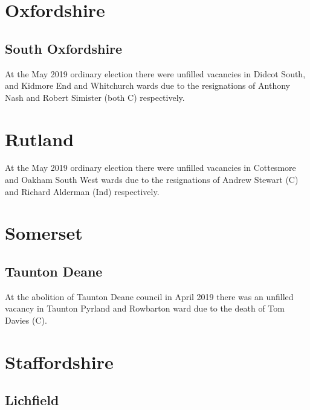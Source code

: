 \documentclass[a4paper,openany]{book}
\begin{document}
\begin{resultsiii}
\section{Oxfordshire}

\subsection*{South Oxfordshire}

At the May 2019 ordinary election there were unfilled vacancies in Didcot South, and Kidmore End and Whitchurch wards due to the resignations of Anthony Nash and Robert Simister (both C) respectively.

\section{Rutland}

At the May 2019 ordinary election there were unfilled vacancies in Cottesmore and Oakham South West wards due to the resignations of Andrew Stewart (C) and Richard Alderman (Ind) respectively.

\section{Somerset}

\subsection*{Taunton Deane}

At the abolition of Taunton Deane council in April 2019 there was an unfilled vacancy in Taunton Pyrland and Rowbarton ward due to the death of Tom Davies (C).

\section{Staffordshire}

\subsection*{Lichfield}


\end{resultsiii}
\end{document}
